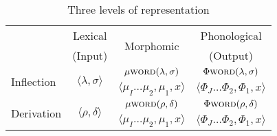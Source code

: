 \begin{table}[ht]
\centering %
\begin{tabular}{l c c c}
\hline\hline%
    & Lexical & \multirow{2}{*}{Morphomic}  & Phonological  \\
    & (Input)	 &        	&  (Output) \\
\hline
\multirow{2}{*}{Inflection} & \multirow{2}{*}{$\langle \lambda,\sigma \rangle$} & $\mu{\textsc{word}}(\lambda,\sigma)$ & $\Phi{\textsc{word}}(\lambda,\sigma)$\\     
    				&  &  $\langle  \mu_{I} \dots \mu_{2}, \mu_{1}, x \rangle$ & 
				$\langle  \Phi_{J} \dots \Phi_{2}, \Phi_{1}, x \rangle$ \\ \hline 
\multirow{2}{*}{Derivation} & \multirow{2}{*}{$\langle \rho,\delta \rangle$} & 
$\mu{\textsc{word}}(\rho,\delta)$ & 
$\Phi{\textsc{word}}(\rho,\delta)$ \\
    				& & $\langle \mu_{I} \dots \mu_{2}, \mu_{1}, x \rangle$ & $\langle \Phi_{J} \dots \Phi_{2}, \Phi_{1}, x \rangle$ \\[0.5ex]
\hline 
\end{tabular}
\caption{Three levels of representation} %
\label{tab:morphreps}
\end{table}

